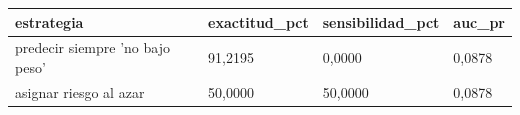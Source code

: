 \begin{tabular}{llll}
\toprule
estrategia & exactitud\_pct & sensibilidad\_pct & auc\_pr \\
\midrule
predecir siempre 'no bajo peso' & 91{,}2195 & 0{,}0000 & 0{,}0878 \\
asignar riesgo al azar & 50{,}0000 & 50{,}0000 & 0{,}0878 \\
\bottomrule
\end{tabular}

